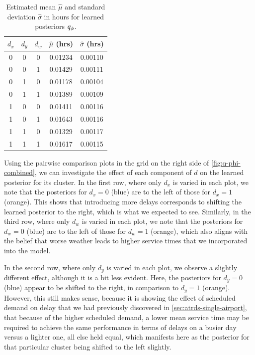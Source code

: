 \begin{table}[htb]
    \centering
    \begin{tabular}{|c|c|c||c|c|}
        \hline
        $d_x$ & $d_y$ & $d_w$ & $\hat\mu$ (hrs) & $\hat\sigma$ (hrs) \\
        \hline\hline
        0 & 0 & 0 & 0.01234 & 0.00110 \\
        \hline
        0 & 0 & 1 & 0.01429 & 0.00111 \\
        \hline
        0 & 1 & 0 & 0.01178 & 0.00104 \\
        \hline
        0 & 1 & 1 & 0.01389 & 0.00109 \\
        \hline
        1 & 0 & 0 & 0.01411 & 0.00116 \\
        \hline
        1 & 0 & 1 & 0.01643 & 0.00116 \\
        \hline
        1 & 1 & 0 & 0.01329 & 0.00117 \\
        \hline
        1 & 1 & 1 & 0.01617 & 0.00115 \\
        \hline
    \end{tabular}
    \caption{Estimated mean $\hat\mu$ and standard deviation $\hat\sigma$ in hours for learned posteriors $q_{\phi}$.}
    \label{tab:q-phi-results}
\end{table}

Using the pairwise comparison plots in the grid on the right side of \cref{fig:q-phi-combined}, we can investigate the effect of each component of $d$ on the learned posterior for its cluster. In the first row, where only $d_x$ is varied in each plot, we note that the posteriors for $d_x=0$ (blue) are to the left of those for $d_x=1$ (orange). This shows that introducing more delays corresponds to shifting the learned posterior to the right, which is what we expected to see. Similarly, in the third row, where only $d_w$ is varied in each plot, we note that the posteriors for $d_w=0$ (blue) are to the left of those for $d_w=1$ (orange), which also aligns with the belief that worse weather leads to higher service times that we incorporated into the model.

In the second row, where only $d_y$ is varied in each plot, we observe a slightly different effect, although it is a bit less evident. Here, the posteriors for $d_y=0$ (blue) appear to be shifted to the right, in comparison to $d_y=1$ (orange). However, this still makes sense, because it is showing the effect of scheduled demand on delay that we had previously discovered in \cref{sec:atrds-single-airport}, that because of the higher scheduled demand, a lower mean service time may be required to achieve the same performance in terms of delays on a busier day versus a lighter one, all else held equal, which manifests here as the posterior for that particular cluster being shifted to the left slightly.


